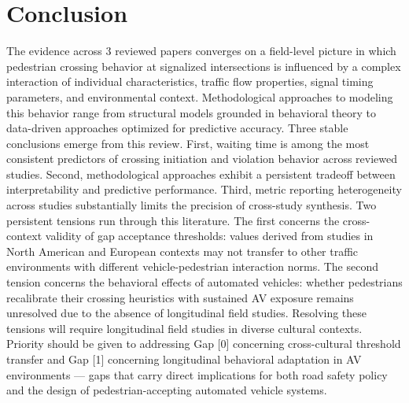 \documentclass{article}
\begin{document}
\section{Conclusion}
The evidence across 3 reviewed papers converges on a field-level picture in which pedestrian crossing behavior at signalized intersections is influenced by a complex interaction of individual characteristics, traffic flow properties, signal timing parameters, and environmental context. Methodological approaches to modeling this behavior range from structural models grounded in behavioral theory to data-driven approaches optimized for predictive accuracy. Three stable conclusions emerge from this review. First, waiting time is among the most consistent predictors of crossing initiation and violation behavior across reviewed studies. Second, methodological approaches exhibit a persistent tradeoff between interpretability and predictive performance. Third, metric reporting heterogeneity across studies substantially limits the precision of cross-study synthesis. Two persistent tensions run through this literature. The first concerns the cross-context validity of gap acceptance thresholds: values derived from studies in North American and European contexts may not transfer to other traffic environments with different vehicle-pedestrian interaction norms. The second tension concerns the behavioral effects of automated vehicles: whether pedestrians recalibrate their crossing heuristics with sustained AV exposure remains unresolved due to the absence of longitudinal field studies. Resolving these tensions will require longitudinal field studies in diverse cultural contexts. Priority should be given to addressing Gap [0] concerning cross-cultural threshold transfer and Gap [1] concerning longitudinal behavioral adaptation in AV environments — gaps that carry direct implications for both road safety policy and the design of pedestrian-accepting automated vehicle systems.
\end{document}

